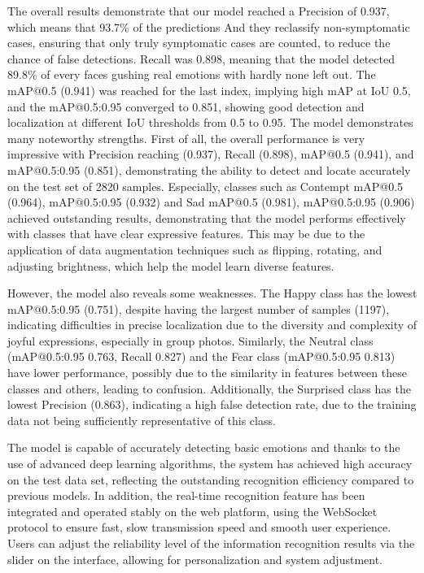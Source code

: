 \documentclass[a4paper,13pt]{report}
\begin{document}
The overall results demonstrate that our model reached a Precision of 0.937, which means that 93.7\% of the predictions And they reclassify non-symptomatic cases, ensuring that only truly symptomatic cases are counted, to reduce the chance of false detections. Recall was 0.898, meaning that the model detected 89.8\% of every faces gushing real emotions with hardly none left out. The mAP@0.5 (0.941) was reached for the last index, implying high mAP at IoU 0.5, and the mAP@0.5:0.95 converged to 0.851, showing good detection and localization at different IoU thresholds from 0.5 to 0.95. The model demonstrates many noteworthy strengths. First of all, the overall performance is very impressive with Precision reaching (0.937), Recall (0.898), mAP@0.5 (0.941), and mAP@0.5:0.95 (0.851), demonstrating the ability to detect and locate accurately on the test set of 2820 samples. Especially, classes such as Contempt mAP@0.5 (0.964), mAP@0.5:0.95 (0.932) and Sad mAP@0.5 (0.981), mAP@0.5:0.95 (0.906) achieved outstanding results, demonstrating that the model performs effectively with classes that have clear expressive features. This may be due to the application of data augmentation techniques such as flipping, rotating, and adjusting brightness, which help the model learn diverse features.

However, the model also reveals some weaknesses. The Happy class has the lowest mAP@0.5:0.95 (0.751), despite having the largest number of samples (1197), indicating difficulties in precise localization due to the diversity and complexity of joyful expressions, especially in group photos. Similarly, the Neutral class (mAP@0.5:0.95 0.763, Recall 0.827) and the Fear class (mAP@0.5:0.95 0.813) have lower performance, possibly due to the similarity in features between these classes and others, leading to confusion. Additionally, the Surprised class has the lowest Precision (0.863), indicating a high false detection rate, due to the training data not being sufficiently representative of this class.

The model is capable of accurately detecting basic emotions and thanks to the use of advanced deep learning algorithms, the system has achieved high accuracy on the test data set, reflecting the outstanding recognition efficiency compared to previous models. In addition, the real-time recognition feature has been integrated and operated stably on the web platform, using the WebSocket protocol to ensure fast, slow transmission speed and smooth user experience. Users can adjust the reliability level of the information recognition results via the slider on the interface, allowing for personalization and system adjustment.
\end{document}
